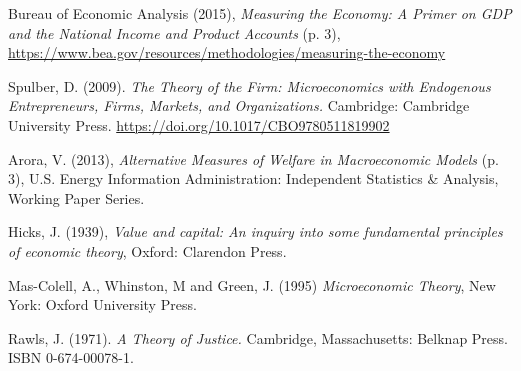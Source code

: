 \documentclass[smallextended]{svjour3}
\begin{document}
\begin{thebibliography}{9}

Bureau of Economic Analysis (2015),
\emph{Measuring the Economy: A Primer on GDP and the National Income and Product Accounts} (p. 3),
\url{https://www.bea.gov/resources/methodologies/measuring-the-economy}

Spulber, D. (2009).
\emph{The Theory of the Firm: Microeconomics with Endogenous Entrepreneurs, Firms, Markets, and Organizations.}
Cambridge: Cambridge University Press. 
\url{https://doi.org/10.1017/CBO9780511819902}

Arora, V. (2013),
\emph{Alternative Measures of Welfare in Macroeconomic Models} (p. 3),
U.S. Energy Information Administration: 
Independent Statistics \& Analysis, Working Paper Series.

Hicks, J. (1939), 
\emph{Value and capital: An inquiry into some fundamental principles of economic theory}, 
Oxford: Clarendon Press.

Mas-Colell, A., Whinston, M and Green, J. (1995) 
\emph{Microeconomic Theory}, 
New York: Oxford University Press.

Rawls, J. (1971).
\emph{A Theory of Justice.}
Cambridge, Massachusetts: Belknap Press.
ISBN 0-674-00078-1.

\end{thebibliography}
\end{document}
